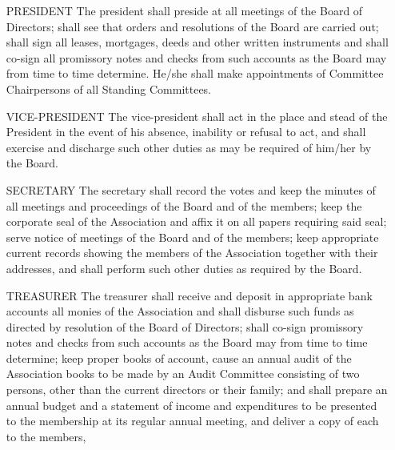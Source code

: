 \documentclass[10pt, letterpaper]{article}
\begin{document}
\begin{enumerate}
\begin{itemize}
      \item[PRESIDENT]
        The president shall preside at all meetings of the Board of Directors; shall see that orders and resolutions of the Board are carried out; shall sign all leases, mortgages, deeds and other written instruments and shall co-sign all promissory notes and checks from such accounts as the Board may from time to time determine.
        He/she shall make appointments of Committee Chairpersons of all Standing Committees.
      \item[VICE-PRESIDENT]
        The vice-president shall act in the place and stead of the President in the event of his absence, inability or refusal to act, and shall exercise and discharge such other duties as may be required of him/her by the Board.
      \item[SECRETARY]
        The secretary shall record the votes and keep the minutes of all meetings and proceedings of the Board and of the members; keep the corporate seal of the Association and affix it on all papers requiring said seal; serve notice of meetings of the Board and of the members; keep appropriate current records showing the members of the Association together with their addresses, and shall perform such other duties as required by the Board.
      \item[TREASURER]
        The treasurer shall receive and deposit in appropriate bank accounts all monies of the Association and shall disburse such funds as directed by resolution of the Board of Directors; shall co-sign promissory notes and checks from such accounts as the Board may from time to time determine; keep proper books of account, cause an annual audit of the Association books to be made by an Audit Committee consisting of two persons, other than the current directors or their family; and shall prepare an annual budget and a statement of income and expenditures to be presented to the membership at its regular annual meeting, and deliver a copy of each to the members,
    \end{itemize}
\end{enumerate}

\end{document}
